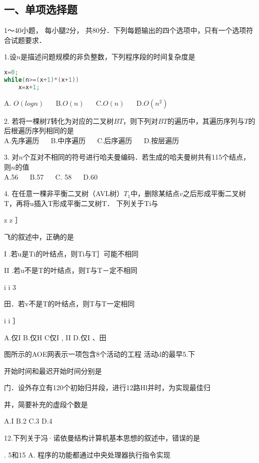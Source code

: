 
\subsection{一、单项选择题}
1～40小题， 每小腿2分， 共80分．下列每题输出的四个选项中，只有一个选项符合试题要求．

1.设$n$是描述问题规模的非负整数，下列程序段的时间复杂度是
\begin{lstlisting}[language=cpp]
x=0;
while(n>=(x+1)*(x+1))
    x=x+1;
\end{lstlisting}
A. $O(logn)$  $\quad$  B.$O(n)$  $\quad$   C.$O(n)$  $\quad$  D.$O(n^2)$

2. 若将一棵树$T$转化为对应的二叉树$BT$，则下列对$BT$的遍历中，其遍历序列与$T$的后根遍历序列相同的是 \\
A.先序遍历  $\quad$  B.中序遍历  $\quad$  C.后序遍历  $\quad$ D.按层遍历

3. 对$n$个互对不相同的符号进行哈夫曼编码．若生成的哈夫曼树共有115个结点，则$n$的值 \\
A.56  $\quad$  B.57  $\quad$  C. 58  $\quad$  D.60

4. 在任意一棵非平衡二叉树（AVL树）$T_1$中，删除某结点$v$之后形成平衡二叉树T，再将u插入T形成平衡二叉树T． 下列关于Ti与

    z    z    ］

  飞的叙述中，正确的是

   I .若u是Ti的叶结点，则Ti与T］可能不相同

   II .若u不是T的叶结点，则T与T－定不相同

    i    i    3

  田．若v不是T的叶结点，则T与T一定相同

    i    i    ］

  A.仅I    B.仅H    C仅I , II    D.仅I 、田

    图所示的AOE网表示一项包含8个活动的工程  活动d的最早5.下

  开始时间和最迟开始时间分别是

    门．设外存立有120个初始归并段，进行12路Hl并时，为实现最佳归

    井，简要补充的虚段个数是

    A.I    B.2    C.3    D.4

    12.下列关于冯·诺依曼结构计算机基本思想的叙述中，错误的是

    . 5和15    A. 程序的功能都通过中央处理器执行指令实现

